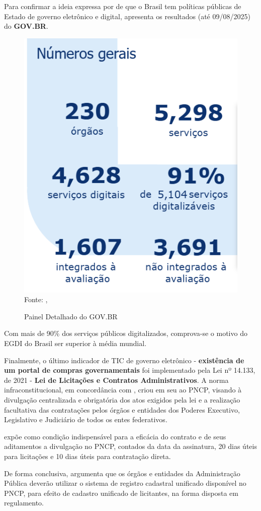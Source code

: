Para confirmar a ideia expressa por \cite{mitkiewicz2024transformacao} de que o Brasil tem políticas públicas de Estado de governo eletrônico e digital, \cite{painel_completo_monitoramento_govbr} apresenta os resultados (até 09/08/2025) do \textbf{GOV.BR}.

\begin{figure}[H]
    \centering
    \caption{Painel Detalhado do GOV.BR}
    \includegraphics[width=0.5\linewidth]{figuras/painel_govbr.PNG}
    \label{fig:placeholder}
    \\ \footnotesize{Fonte: \cite{painel_completo_monitoramento_govbr},}
\end{figure}

Com mais de 90\% dos serviços públicos digitalizados, comprova-se o motivo do EGDI do Brasil ser superior à média mundial.

Finalmente, o último indicador de TIC de governo eletrônico - \textbf{existência de um portal de compras governamentais} foi implementado pela Lei nº 14.133, de 2021 - \textbf{Lei de Licitações e Contratos Administrativos}. A norma infraconstitucional, em concordância com \cite{l14133}, criou em seu ao PNCP, visando à divulgação centralizada e obrigatória dos atos exigidos pela lei e a realização facultativa das contratações pelos órgãos e entidades dos Poderes Executivo, Legislativo e Judiciário de todos os entes federativos.

\cite{l14133} expõe como condição indispensável para a eficácia do contrato e de seus aditamentos a divulgação no PNCP, contados da data da assinatura, 20 dias úteis para licitações e 10 dias úteis para contratação direta.

De forma conclusiva, \cite{l14133} argumenta que os órgãos e entidades da Administração Pública deverão utilizar o sistema de registro cadastral unificado disponível no PNCP, para efeito de cadastro unificado de licitantes, na forma disposta em regulamento.

